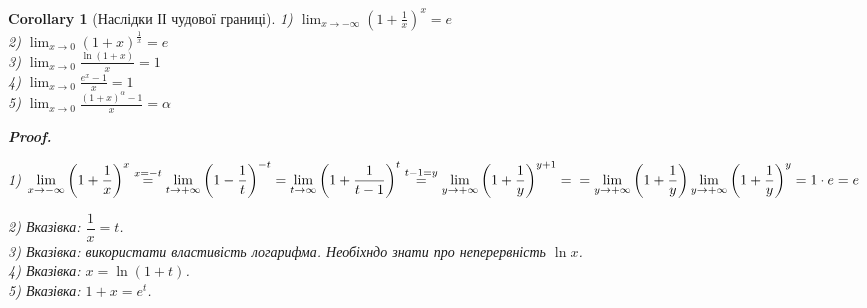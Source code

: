 \documentclass[a4paper, 14pt]{article}
\makeatletter
\def\qed{$\blacksquare$}
\theoremstyle{theoremdd}
\theoremstyle{theoremdd}
\theoremstyle{theoremdd}
\theoremstyle{theoremdd}
\theoremstyle{theoremdd}
\theoremstyle{theoremdd}
\theoremstyle{theoremdd}
\theoremstyle{theoremdd}
\newtheorem{corollary}[theorem]{Corollary}
\renewenvironment{proof}[1][Proof.\\]{\par
\pushQED{\hfill \qed}%
\normalfont \topsep6\p@\@plus6\p@\relax
\trivlist
\item\relax
{\bfseries
#1\@addpunct{.}}\hspace\labelsep\ignorespaces
}{%
\popQED\endtrivlist\@endpefalse
}
\makeatother
\begin{document}
\begin{corollary}[Наслідки ІІ чудової границі]
1) $\displaystyle \lim_{x \to -\infty} \left(1 +\frac{1}{x} \right)^x = e$\\
2) $\displaystyle \lim_{x \to 0} \left(1 +x \right)^{\textstyle \frac{1}{x}} = e$\\
3) $\displaystyle \lim_{x \to 0} \frac{\ln(1+x)}{x} = 1$\\
4) $\displaystyle \lim_{x \to 0} \frac{e^x - 1}{x} = 1$\\
5) $\displaystyle \lim_{x \to 0} \frac{(1+x)^\alpha - 1}{x} = \alpha$

\begin{proof}
1) $\displaystyle\lim_{x \to -\infty} \left(1 + \dfrac{1}{x} \right)^x \overset{x =-t}{=} \lim_{t \to +\infty} \left(1 - \dfrac{1}{t} \right)^{-t} = \lim_{t \to \infty} \left(1 + \dfrac{1}{t-1} \right)^t \overset{t-1 = y}{=} \lim_{y \to +\infty} \left(1 + \dfrac{1}{y} \right)^{y+1} = \\ = \lim_{y \to +\infty} \left( 1 + \dfrac{1}{y} \right) \lim_{y \to +\infty} \left( 1 + \dfrac{1}{y} \right)^y = 1 \cdot e = e$
\end{proof}

2) \textit{Вказівка: $\dfrac{1}{x} = t$.}\\
3) \textit{Вказівка: використати властивість логарифма. Необіхндо знати про неперервність $\ln x$.}\\
4) \textit{Вказівка: $x = \ln(1+t)$.}\\
5) \textit{Вказівка: $1 + x = e^t$.}
\end{corollary}
\end{document}
